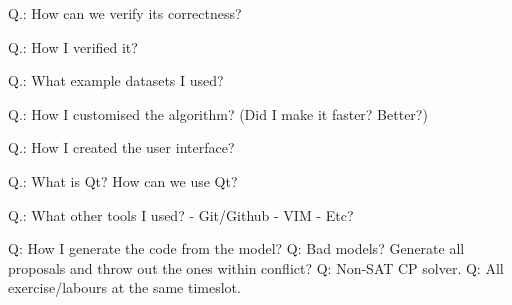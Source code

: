 Q.: How can we verify its correctness?

Q.: How I verified it?

Q.: What example datasets I used?

Q.: How I customised the algorithm? (Did I make it faster? Better?)

Q.: How I created the user interface?

Q.: What is Qt? How can we use Qt?

Q.: What other tools I used?
- Git/Github
- VIM
- Etc?

Q: How I generate the code from the model?
Q: Bad models? Generate all proposals and throw out the ones within conflict?
Q: Non-SAT CP solver.
Q: All exercise/labours at the same timeslot.

